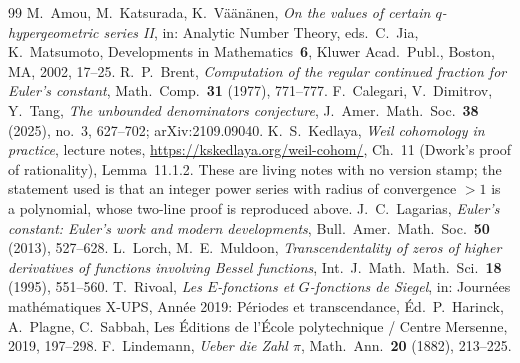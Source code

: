 \documentclass[11pt]{article}
\theoremstyle{plain}
\theoremstyle{definition}
\theoremstyle{remark}
\begin{document}
\begin{thebibliography}{99}
 M.~Amou, M.~Katsurada, K.~V\"a\"an\"anen, \emph{On the values of certain
$q$-hypergeometric series II}, in: Analytic Number Theory, eds.\ C.~Jia, K.~Matsumoto,
Developments in Mathematics~\textbf{6}, Kluwer Acad.\ Publ., Boston, MA, 2002, 17--25.
 R.~P.~Brent, \emph{Computation of the regular continued fraction for Euler's
constant}, Math.\ Comp.\ \textbf{31} (1977), 771--777.
 F.~Calegari, V.~Dimitrov, Y.~Tang, \emph{The unbounded denominators conjecture},
J.~Amer.\ Math.\ Soc.\ \textbf{38} (2025), no.~3, 627--702; arXiv:2109.09040.
 K.~S.~Kedlaya, \emph{Weil cohomology in practice}, lecture notes,
\url{https://kskedlaya.org/weil-cohom/}, Ch.~11 (Dwork's proof of rationality), Lemma~11.1.2.
These are living notes with no version stamp; the statement used is that an integer power series
with radius of convergence $>1$ is a polynomial, whose two-line proof is reproduced above.
 J.~C.~Lagarias, \emph{Euler's constant: Euler's work and modern developments},
Bull.\ Amer.\ Math.\ Soc.\ \textbf{50} (2013), 527--628.
 L.~Lorch, M.~E.~Muldoon, \emph{Transcendentality of zeros of higher
derivatives of functions involving Bessel functions}, Int.\ J.\ Math.\ Math.\ Sci.\ \textbf{18}
(1995), 551--560.
 T.~Rivoal, \emph{Les $E$-fonctions et $G$-fonctions de Siegel}, in:
Journ\'ees math\'ematiques X-UPS, Ann\'ee 2019: P\'eriodes et transcendance, \'Ed.\ P.~Harinck,
A.~Plagne, C.~Sabbah, Les \'Editions de l'\'Ecole polytechnique / Centre Mersenne, 2019, 197--298.
 F.~Lindemann, \emph{Ueber die Zahl $\pi$},
Math.\ Ann.\ \textbf{20} (1882), 213--225.


\end{thebibliography}
\end{document}
